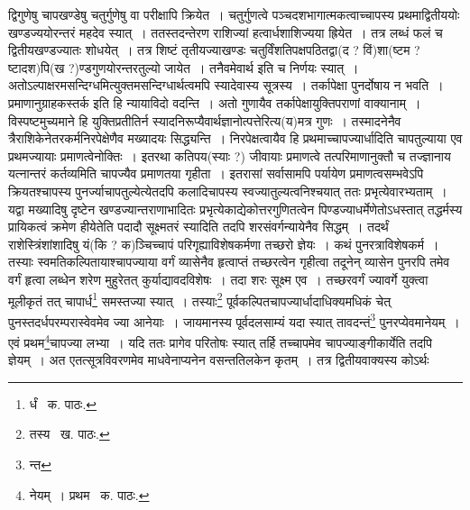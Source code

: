 \documentclass[11pt, openany]{book}
\begin{document}
\noindent द्विगुणेषु चापखण्डेषु चतुर्गुणेषु वा परीक्षापि क्रियेत~। चतुर्गुणत्वे पञ्चदशभागात्मकत्वाच्चापस्य प्रथमाद्वितीययोः खण्डज्ययोरन्तरं महदेव स्यात्~। ततस्तदन्तेरण राशिज्यां हत्वार्धशाशिज्यया ह्रियेत~। तत्र लब्धं फलं च द्वितीयखण्डज्यातः शोधयेत्~। तत्र शिष्टं तृतीयज्याखण्डः चतुर्विंशतिपक्षपठितद्वा(द ? विं)शा(ष्टम ? ष्टादश)पि(ख ?)ण्डगुणयोरन्तरतुल्यो जायेत~। तनैवमेवार्थ इति च निर्णयः स्यात्~। अतोऽल्पाक्षरमसन्दिग्धमित्युक्तमसन्दिग्धार्थत्वमपि स्यादेवास्य सूत्रस्य~। तर्कापेक्षा पुनर्दोषाय न भवति~। प्रमाणानुग्राहकस्तर्क इति हि न्यायाविदो वदन्ति~। अतो गुणायैव तर्कापेक्षायुक्तिपराणां वाक्यानाम्~। विस्पष्टमुच्यमाने हि युक्तिप्रतीतिर्न
स्यादनिरूप्यैवार्थज्ञानोत्पत्तेरित्य(य)मत्र गुणः~। तस्मादनेनैव त्रैराशिकेनेतरकर्मनिरपेक्षेणैव मख्यादयः सिद्ध्यन्ति~। निरपेक्षत्वायैव हि प्रथमाच्चापज्यार्धादिति चापतुल्याया एव प्रथमज्यायाः प्रमाणत्वेनोक्तिः~। इतरथा कतिपय(स्याः ?) जीवायाः प्रमाणत्वे तत्परिमाणानुक्तौ च तज्ज्ञानाय यत्नान्तरं कर्तव्यमिति चापज्यैव प्रमाणतया गृहीता~। इतरासां सर्वासामपि पर्यायेण प्रमाणत्वसम्भवेऽपि क्रियतश्चापस्य पुनर्ज्याचापतुल्येत्येतदपि कलादिचापस्य स्वज्यातुल्यत्वनिश्चयात् ततः प्रभृत्येवारभ्यताम्~। यद्वा मख्यादिषु दृष्टेन खण्डज्यान्तराणाभादितः
प्रभृत्येकाद्येकोत्तरगुणितत्वेन पिण्डज्याधर्मेणेतोऽधस्तात् तद्धर्मस्य प्रायिकत्वं क्रमेण हीयेतेति पदादौ सूक्ष्मतरं स्यादिति तदपि शरसंवर्गन्यायेनैव
सिद्धम्~। तदर्थं राशेस्त्रिंशांशादिषु यं(कि ? क)ञ्चिच्चापं परिगृह्याविशेषकर्मणा तच्छरो ज्ञेयः~। कथं पुनरत्राविशेषकर्म~। तस्याः स्वमतिकल्पितायाश्चापज्याया वर्गं व्यासेनैव हृत्वाप्तं तच्छरत्वेन गृहीत्वा तदूनेन् व्यासेन पुनरपि तमेव वर्गं हृत्वा लब्धेन शरेण मुहुरेतत् कुर्याद्यावदविशेषः~। तदा शरः सूक्ष्म एव~। तच्छरवर्गं ज्यावर्गे युक्त्वा मूलीकृतं तत् चापार्ध\renewcommand{\thefootnote}{१}\footnote{र्धं \textendash\ क. पाठः.} समस्तज्या स्यात्~। तस्याः\renewcommand{\thefootnote}{२}\footnote{तस्य \textendash\ ख. पाठः.} पूर्वकल्पितचापज्यार्धादाधिक्यमधिकं चेत् पुनस्तदर्धपरम्परास्वेवमेव ज्या आनेयाः~। जायमानस्य पूर्वदलसाम्यं यदा स्यात् तावदन्तं\renewcommand{\thefootnote}{३}\footnote{न्त} पुनरप्येवमानेयम्~। एवं प्रथम\renewcommand{\thefootnote}{४}\footnote{नेयम्~। प्रथम \textendash\ क. पाठः.}चापज्या लभ्या~। यदि ततः प्रागेव परितोषः स्यात् तर्हि तच्चापमेव चापज्याङ्गीकार्येति तदपि ज्ञेयम्~। अत एतत्सूत्रविवरणमेव माधवेनाप्यनेन वसन्ततिलकेन कृतम्~। तत्र द्वितीयवाक्यस्य कोऽर्थः

\newpage
\end{document}
